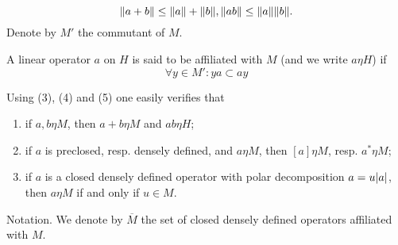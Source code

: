 \[
    \norm{a+b}\leq \norm{a}+\norm{b}, \norm{ab}\leq \norm{a}\norm{b}.
\]
Denote by $M'$ the commutant of $M$.\par
\begin{definition}
    A linear operator $a$ on $H$ is said to be affiliated with $M$ (and we write $a\eta H$) if
\begin{equation}
    \forall y\in M':ya\subset ay
\end{equation}
\end{definition} 
\begin{remark}
    Using (3), (4) and (5) one easily verifies that
\end{remark}
\begin{enumerate}
    \item if $a,b\eta M$, then $a+b\eta M$ and $ab\eta H$;
    \item if $a$ is preclosed, resp. densely defined, and $a\eta M$, then $[a] \eta M$, resp. $a^*\eta M$;
    \item if $a$ is a closed densely defined operator with polar decomposition $a=u\abs{a}$, then $a\eta M$ if and only if $u\in M$.
\end{enumerate}
Notation. We denote by $\overline{M}$ the set of closed densely defined operators affiliated with $M$.\par
\bigskip
